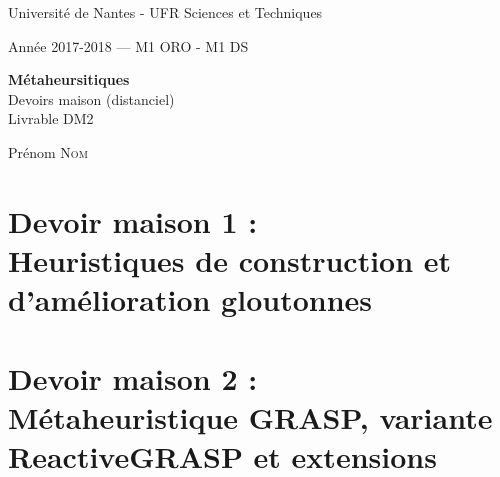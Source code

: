 \documentclass[ a4paper,10pt]{article}
\begin{document}
{\large
\begin{center}
Université de Nantes - UFR Sciences et Techniques

Année 2017-2018    ---   M1 ORO - M1 DS
\vspace{5mm}
 
{ \Large \textbf {Métaheursitiques }\\ Devoirs maison (distanciel)\\ Livrable DM2 \medskip
 
  Prénom \textsc{Nom}
}  
\end{center}
}

%
%
\section{Devoir maison 1 : \\ Heuristiques de construction et d'amélioration gloutonnes}


\vfill
\break
%
%
\section{Devoir maison 2 : \\ Métaheuristique GRASP, variante ReactiveGRASP et extensions}

\end{document}
